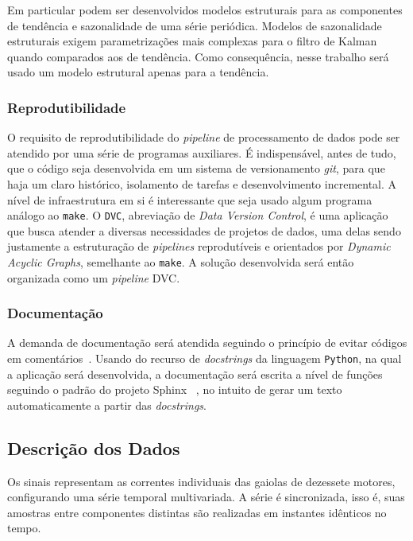 Em particular podem ser desenvolvidos modelos estruturais para as componentes
de tendência e sazonalidade de uma série periódica. Modelos de sazonalidade
estruturais exigem parametrizações mais complexas para o filtro de Kalman
quando comparados aos de tendência. Como consequência, nesse trabalho será
usado um modelo estrutural apenas para a tendência.

\subsubsection{Reprodutibilidade}

O requisito de reprodutibilidade do \emph{pipeline} de processamento de dados
pode ser atendido por uma série de programas auxiliares. É indispensável,
antes de tudo, que o código seja desenvolvida em um sistema de
versionamento \emph{git}, para que haja um claro histórico, isolamento de
tarefas e desenvolvimento incremental. A nível de infraestrutura em si
é interessante que seja usado algum programa análogo ao \verb+make+. O
\verb+DVC+, abreviação de \emph{Data Version Control}, é uma aplicação que
busca atender a diversas necessidades de projetos de dados, uma delas sendo
justamente a estruturação de \emph{pipelines} reprodutíveis e orientados por
\emph{Dynamic Acyclic Graphs}, semelhante ao \verb+make+. A solução
desenvolvida será então organizada como um \emph{pipeline} DVC.

\subsubsection{Documentação}

A demanda de documentação será atendida seguindo o princípio de evitar códigos
em comentários~\cite{clean_code}. Usando do recurso de \emph{docstrings} da
linguagem \verb+Python+, na qual a aplicação será desenvolvida, a documentação
será escrita a nível de funções seguindo o padrão do projeto Sphinx
~\cite{sphinx}, no intuito de gerar um texto automaticamente a partir das
\emph{docstrings}.

\subsection{Descrição dos Dados}

Os sinais representam as correntes individuais das gaiolas de dezessete
motores, configurando uma série temporal multivariada. A série é sincronizada,
isso é, suas amostras entre componentes distintas são realizadas em instantes
idênticos no tempo.

